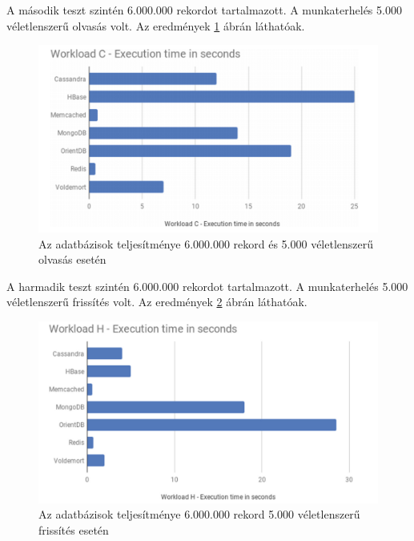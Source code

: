 A második teszt szintén 6.000.000 rekordot tartalmazott. A munkaterhelés 5.000 véletlenszerű olvasás volt. Az eredmények \ref{fig:performance_b} ábrán láthatóak.
	
	\begin{figure}
		\centering
		\includegraphics[scale=0.9]{figures/images/performance_b.png}
		\caption{Az adatbázisok teljesítménye 6.000.000 rekord és 5.000 véletlenszerű olvasás esetén \cite{martins2019study}}
		\label{fig:performance_b}
	\end{figure}
	
A harmadik teszt szintén 6.000.000 rekordot tartalmazott. A munkaterhelés 5.000 véletlenszerű frissítés volt. Az eredmények \ref{fig:performance_c} ábrán láthatóak.
	
	\begin{figure}
		\centering
		\includegraphics[scale=0.9]{figures/images/performance_c.png}
		\caption{Az adatbázisok teljesítménye 6.000.000 rekord 5.000 véletlenszerű frissítés esetén \cite{martins2019study}}
		\label{fig:performance_c}
	\end{figure}